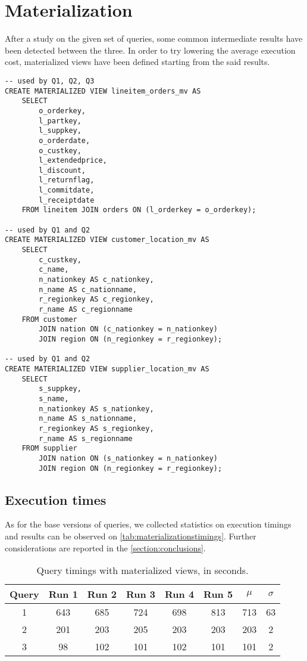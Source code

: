 

\section{Materialization}
\label{section:materialization}

After a study on the given set of queries, some common intermediate results have been detected between the three. In order to try lowering the average execution cost, materialized views have been defined starting from the said results.

\begin{lstlisting}
-- used by Q1, Q2, Q3
CREATE MATERIALIZED VIEW lineitem_orders_mv AS
	SELECT 
		o_orderkey, 
		l_partkey, 
		l_suppkey, 
		o_orderdate, 
		o_custkey, 
		l_extendedprice, 
		l_discount, 
		l_returnflag,
		l_commitdate,
		l_receiptdate
	FROM lineitem JOIN orders ON (l_orderkey = o_orderkey);

-- used by Q1 and Q2
CREATE MATERIALIZED VIEW customer_location_mv AS
	SELECT 
		c_custkey, 
		c_name, 
		n_nationkey AS c_nationkey, 
		n_name AS c_nationname, 
		r_regionkey AS c_regionkey, 
		r_name AS c_regionname 
	FROM customer 
		JOIN nation ON (c_nationkey = n_nationkey)
		JOIN region ON (n_regionkey = r_regionkey);
		
-- used by Q1 and Q2
CREATE MATERIALIZED VIEW supplier_location_mv AS
	SELECT 
		s_suppkey, 
		s_name, 
		n_nationkey AS s_nationkey, 
		n_name AS s_nationname, 
		r_regionkey AS s_regionkey, 
		r_name AS s_regionname 
	FROM supplier 
		JOIN nation ON (s_nationkey = n_nationkey)
		JOIN region ON (n_regionkey = r_regionkey);
\end{lstlisting}

\subsection{Execution times}

As for the base versions of queries, we collected statistics on execution timings and results can be observed on \autoref{tab:materializationstimings}. Further considerations are reported in the \autoref{section:conclusions}.

\begin{table}[!h]
\centering
\begin{tabular}{|| c | c c c c c | c c ||} 
 \hline
 Query & Run 1 & Run 2 & Run 3 & Run 4 & Run 5 & 	$\mu$ & $\sigma$ \\ [0.5ex] 
 \hline\hline
 1 & 643 & 685 & 724 & 698 & 813 & 713 & 63 \\ 
 \hline
 2 & 201 & 203 & 205 & 203 & 203 & 203 & 2 \\
 \hline
 3 & 98 & 102 & 101 & 102 & 101 & 101 & 2 \\
 \hline
\end{tabular}
  \caption{Query timings with materialized views, in seconds.}
  \label{tab:materializationstimings}
\end{table}